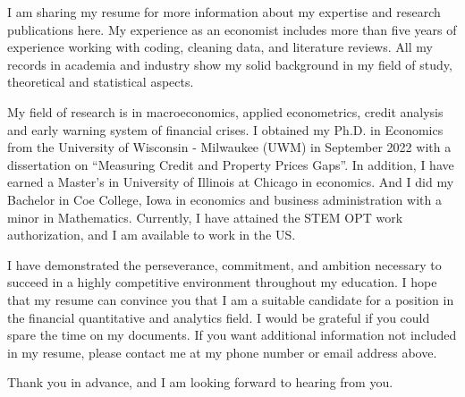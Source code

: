 \documentclass[12pt]{letter} %
\begin{document}
\begin{letter}
I am sharing my resume for more information about my expertise and research publications here. My experience as an economist includes more than five years of experience working with coding, cleaning data, and literature reviews. All my records in academia and industry show my solid background in my field of study, theoretical and statistical aspects.

My field of research is in macroeconomics, applied econometrics, credit analysis and early warning system of financial crises. I obtained my Ph.D. in Economics from the University of Wisconsin - Milwaukee (UWM) in September 2022 with a dissertation on ``Measuring Credit and Property Prices Gaps''. In addition, I have earned a Master's in University of Illinois at Chicago in economics. And I did my Bachelor in Coe College, Iowa in economics and business administration with a minor in Mathematics. Currently, I have attained the STEM OPT work authorization, and I am available to work in the US.

\pagebreak

I have demonstrated the perseverance, commitment, and ambition necessary to succeed in a highly competitive environment throughout my education. I hope that my resume can convince you that I am a suitable candidate for a position in the financial quantitative and analytics field. I would be grateful if you could spare the time on my documents. If you want additional information not included in my resume, please contact me at my phone number or email address above.

Thank you in advance, and I am looking forward to hearing from you.




\end{letter}
\end{document}
